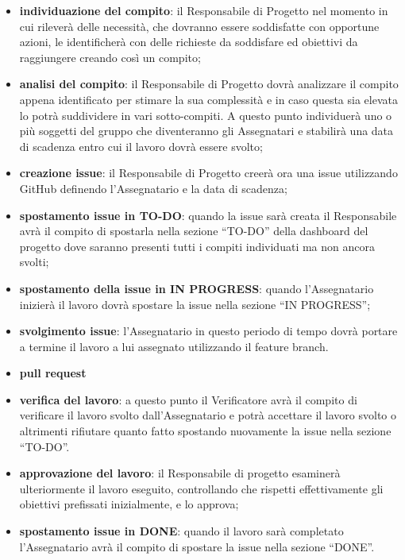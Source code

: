 			\begin{itemize}
				\item\textbf{individuazione del compito}: il Responsabile di Progetto nel momento in cui rileverà delle necessità, che dovranno essere soddisfatte con opportune azioni, le identificherà con delle richieste da soddisfare ed obiettivi da raggiungere creando così un compito;
				\item\textbf{analisi del compito}: il Responsabile di Progetto dovrà analizzare il compito appena identificato per stimare la sua complessità e in caso questa sia elevata lo potrà suddividere in vari sotto-compiti. A questo punto individuerà uno o più soggetti del gruppo che diventeranno gli Assegnatari e stabilirà una data di scadenza entro cui il lavoro dovrà essere svolto;
				\item\textbf{creazione issue}: il Responsabile di Progetto creerà ora una issue utilizzando GitHub definendo l’Assegnatario e la data di scadenza;
				\item\textbf{spostamento issue in TO-DO}: quando la issue sarà creata il Responsabile avrà il compito di spostarla nella sezione “TO-DO” della dashboard del progetto dove saranno presenti tutti i compiti individuati ma non ancora svolti; 
				\item\textbf{spostamento della issue in IN PROGRESS}: quando l’Assegnatario inizierà il lavoro dovrà spostare la issue nella sezione “IN PROGRESS”;
				\item\textbf{svolgimento issue}: l’Assegnatario in questo periodo di tempo dovrà portare a termine il lavoro a lui assegnato utilizzando il feature branch.
				\item\textbf{pull request} %
				\item\textbf{verifica del lavoro}: a questo punto il Verificatore avrà il compito di verificare il lavoro svolto dall’Assegnatario e potrà accettare il lavoro svolto o altrimenti rifiutare quanto fatto spostando nuovamente la issue nella sezione “TO-DO”.
				\item\textbf{approvazione del lavoro}: il Responsabile di progetto esaminerà ulteriormente il lavoro eseguito, controllando che rispetti effettivamente gli obiettivi prefissati inizialmente, e lo approva;
				\item\textbf{spostamento issue in DONE}: quando il lavoro sarà completato l’Assegnatario avrà il compito di spostare la issue nella sezione “DONE”.
			\end{itemize}
